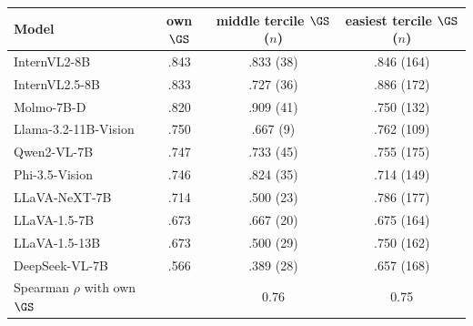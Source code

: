 \begin{tabular}{@{}lccc@{}}
\toprule
Model & own $\GS$ & middle tercile $\GS$ ($n$) & easiest tercile $\GS$ ($n$) \\
\midrule
InternVL2-8B & .843 & .833 (38) & .846 (164) \\
InternVL2.5-8B & .833 & .727 (36) & .886 (172) \\
Molmo-7B-D & .820 & .909 (41) & .750 (132) \\
Llama-3.2-11B-Vision & .750 & .667 (9) & .762 (109) \\
Qwen2-VL-7B & .747 & .733 (45) & .755 (175) \\
Phi-3.5-Vision & .746 & .824 (35) & .714 (149) \\
LLaVA-NeXT-7B & .714 & .500 (23) & .786 (177) \\
LLaVA-1.5-7B & .673 & .667 (20) & .675 (164) \\
LLaVA-1.5-13B & .673 & .500 (29) & .750 (162) \\
DeepSeek-VL-7B & .566 & .389 (28) & .657 (168) \\
\midrule
Spearman $\rho$ with own $\GS$ & & 0.76 & 0.75 \\
\bottomrule
\end{tabular}
